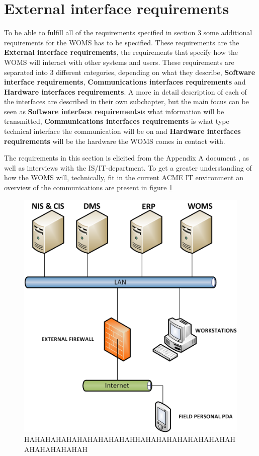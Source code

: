 \section{External interface requirements}
\label{sec:external_interface_requirements}

To be able to fulfill all of the requirements specified in section 3 some additional requirements for the WOMS has to be specified. These requirements are the \textbf{External interface requirements}, the requirements that specify how the WOMS will interact with other systems and users.  These requirements are separated into 3 different categories, depending on what they describe, \textbf{Software interface requirements}, \textbf{Communications interfaces requirements} and \textbf{Hardware interfaces requirements}. A more in detail description of each of the interfaces are described in their own subchapter, but the main focus can be seen as \textbf{Software interface requirements}is what information will be transmitted, \textbf{Communications interfaces requirements} is what type technical interface the communication will be on and \textbf{Hardware interfaces requirements} will be the hardware the WOMS comes in contact with. 

The requirements in this section is elicited from the Appendix A document \cite{}, as well as interviews with the IS/IT-department. To get a greater understanding of how the WOMS will, technically, fit in the current ACME IT environment an overview of the communications are present in figure \ref{fig:external_interfaces}

\begin{figure}[H]
	\includegraphics[width=1\textwidth]{images/external_interfaces.png}
	\caption{HAHAHAHAHAHAHAHAHAHAHHAHAHAHAHAHAHAHAHAHAHAHAHAHAHAH}
	\label{fig:external_interfaces}                      	
\end{figure}

